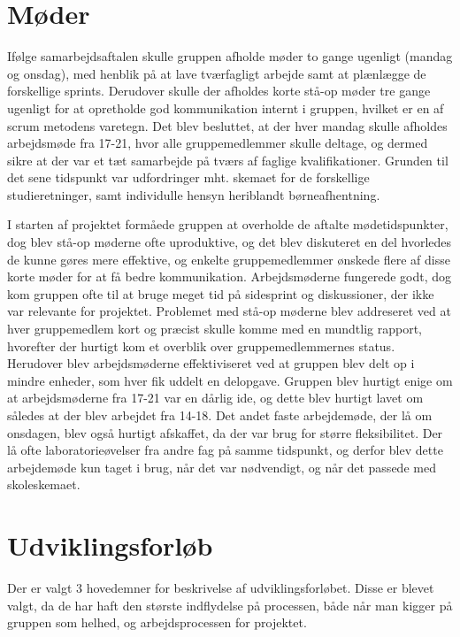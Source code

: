 \section*{Møder}
Ifølge samarbejdsaftalen skulle gruppen afholde møder to gange ugenligt (mandag og onsdag), med henblik på at lave tværfagligt arbejde samt at plænlægge
de forskellige sprints. Derudover skulle der afholdes korte stå-op møder tre gange ugenligt for at opretholde god kommunikation internt i gruppen,
hvilket er en af scrum metodens varetegn.
Det blev besluttet, at der hver mandag skulle afholdes arbejdsmøde fra 17-21, hvor alle gruppemedlemmer skulle deltage, og dermed sikre at der var
et tæt samarbejde på tværs af faglige kvalifikationer. Grunden til det sene tidspunkt var udfordringer mht. skemaet for de forskellige studieretninger,
samt individulle hensyn heriblandt børneafhentning. 

I starten af projektet formåede gruppen at overholde de aftalte mødetidspunkter, dog blev stå-op møderne ofte uproduktive, og det blev diskuteret en del
hvorledes de kunne gøres mere effektive, og enkelte gruppemedlemmer ønskede flere af disse korte møder for at få bedre kommunikation. Arbejdsmøderne fungerede godt,
dog kom gruppen ofte til at bruge meget tid på sidesprint og diskussioner, der ikke var relevante for projektet.
Problemet med stå-op møderne blev addreseret ved at hver gruppemedlem kort og præcist skulle komme med en mundtlig rapport, hvorefter der hurtigt kom et overblik
over gruppemedlemmernes status. Herudover blev arbejdsmøderne effektiviseret ved at gruppen blev delt op i mindre enheder, som hver fik uddelt en delopgave. 
Gruppen blev hurtigt enige om at arbejdsmøderne fra 17-21 var en dårlig ide, og dette blev hurtigt lavet om således at der blev arbejdet fra 14-18.
Det andet faste arbejdemøde, der lå om onsdagen, blev også hurtigt afskaffet, da der var brug for større fleksibilitet. Der lå ofte laboratorieøvelser
fra andre fag på samme tidspunkt, og derfor blev dette arbejdemøde kun taget i brug, når det var nødvendigt, og når det passede med skoleskemaet.    

\section*{Udviklingsforløb}
Der er valgt 3 hovedemner for beskrivelse af udviklingsforløbet. Disse er blevet valgt, da de har haft den største indflydelse på processen, 
både når man kigger på gruppen som helhed, og arbejdsprocessen for projektet.  

